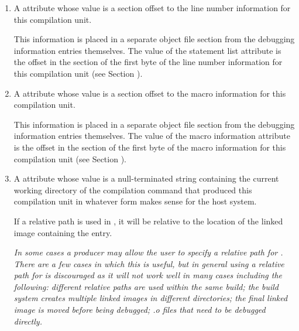 \begin{enumerate}[1. ]
\item \hypertarget{chap:DWATstmtlistlinenumberinformationforunit}{}
A \DWATstmtlistDEFN{}
attribute whose value is a
section offset to the line number information for this compilation
unit.

This information is placed in a separate object file
section from the debugging information entries themselves. The
value of the statement list attribute is the offset in the
\dotdebugline{} section of the first byte of the line number
information for this compilation unit
(see Section ).

\item A \DWATmacrosDEFN{}\hypertarget{chap:DWATmacrosmacroinformation}{}
attribute
whose value is a
section offset to the macro information for this compilation unit.

This information is placed in a separate object file section
from the debugging information entries themselves. The
value of the macro information attribute is the offset in
the \dotdebugmacro{} section of the first byte of the macro
information for this compilation unit
(see Section ).
\db

\item  \hypertarget{chap:DWATcompdircompilationdirectory}{}
A \DWATcompdirDEFN{} attribute
whose value is a
null-terminated string containing the current working directory
of the compilation command that produced this compilation
unit in whatever form makes sense for the host system.

\bb
If a relative path is used in \DWATcompdirNAME, it will be relative
to the location of the linked image containing the \DWATcompdirNAME{}
entry.

\textit{In some cases a producer may allow the user to specify a relative
path for \DWATcompdir. There are a few cases in which this is useful,
but in general using a relative path for \DWATcompdir{} is discouraged
as it will not work well in many cases including the following:
different relative paths are used within the same build; the build
system creates multiple linked images in different directories; the
final linked image is moved before being debugged; .o files that need to
be debugged directly.}
\eb


\end{enumerate}
